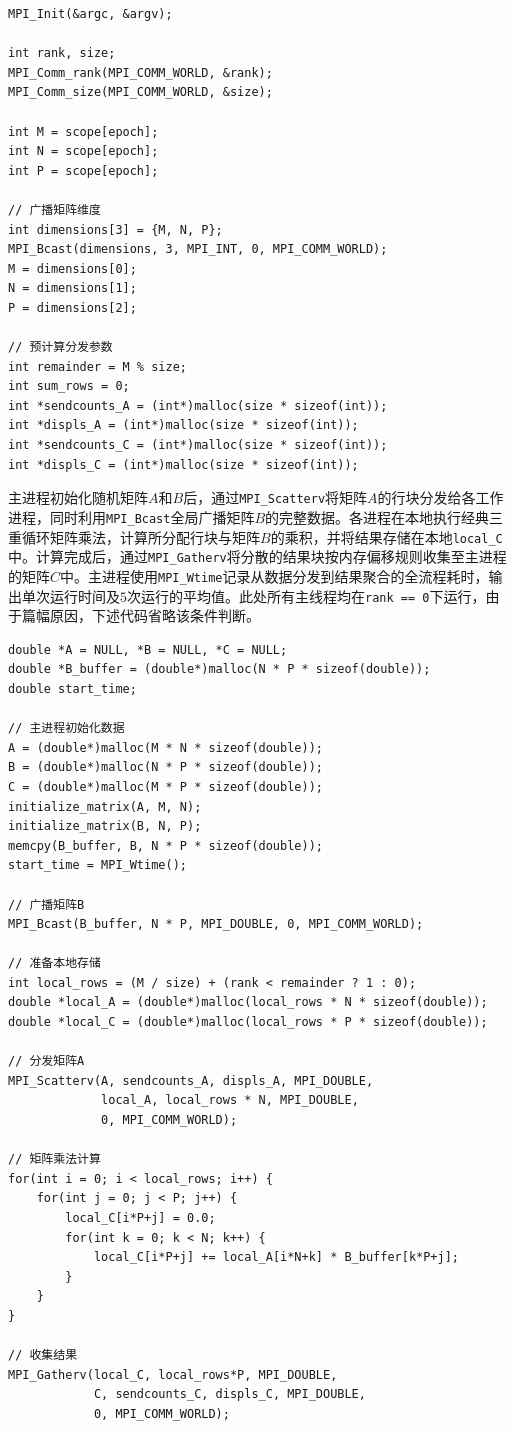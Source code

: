 \documentclass[a4paper, utf8]{ctexart}
\begin{document}
	\begin{verbatim}
MPI_Init(&argc, &argv);

int rank, size;
MPI_Comm_rank(MPI_COMM_WORLD, &rank);
MPI_Comm_size(MPI_COMM_WORLD, &size);

int M = scope[epoch];
int N = scope[epoch];
int P = scope[epoch];

// 广播矩阵维度
int dimensions[3] = {M, N, P};
MPI_Bcast(dimensions, 3, MPI_INT, 0, MPI_COMM_WORLD);
M = dimensions[0];
N = dimensions[1];
P = dimensions[2];

// 预计算分发参数
int remainder = M % size;
int sum_rows = 0;
int *sendcounts_A = (int*)malloc(size * sizeof(int));
int *displs_A = (int*)malloc(size * sizeof(int));
int *sendcounts_C = (int*)malloc(size * sizeof(int));
int *displs_C = (int*)malloc(size * sizeof(int));
	\end{verbatim}
	
	主进程初始化随机矩阵$A$和$B$后，通过\verb|MPI_Scatterv|将矩阵$A$的行块分发给各工作进程，同时利用\verb|MPI_Bcast|全局广播矩阵$B$的完整数据。各进程在本地执行经典三重循环矩阵乘法，计算所分配行块与矩阵$B$的乘积，并将结果存储在本地\verb|local_C|中。计算完成后，通过\verb|MPI_Gatherv|将分散的结果块按内存偏移规则收集至主进程的矩阵$C$中。主进程使用\verb|MPI_Wtime|记录从数据分发到结果聚合的全流程耗时，输出单次运行时间及$5$次运行的平均值。此处所有主线程均在\verb|rank == 0|下运行，由于篇幅原因，下述代码省略该条件判断。
	
	\begin{verbatim}
double *A = NULL, *B = NULL, *C = NULL;
double *B_buffer = (double*)malloc(N * P * sizeof(double));
double start_time;

// 主进程初始化数据
A = (double*)malloc(M * N * sizeof(double));
B = (double*)malloc(N * P * sizeof(double));
C = (double*)malloc(M * P * sizeof(double));
initialize_matrix(A, M, N);
initialize_matrix(B, N, P);
memcpy(B_buffer, B, N * P * sizeof(double));
start_time = MPI_Wtime();

// 广播矩阵B
MPI_Bcast(B_buffer, N * P, MPI_DOUBLE, 0, MPI_COMM_WORLD);

// 准备本地存储
int local_rows = (M / size) + (rank < remainder ? 1 : 0);
double *local_A = (double*)malloc(local_rows * N * sizeof(double));
double *local_C = (double*)malloc(local_rows * P * sizeof(double));

// 分发矩阵A
MPI_Scatterv(A, sendcounts_A, displs_A, MPI_DOUBLE,
             local_A, local_rows * N, MPI_DOUBLE,
             0, MPI_COMM_WORLD);

// 矩阵乘法计算
for(int i = 0; i < local_rows; i++) {
    for(int j = 0; j < P; j++) {
        local_C[i*P+j] = 0.0;
        for(int k = 0; k < N; k++) {
            local_C[i*P+j] += local_A[i*N+k] * B_buffer[k*P+j];
        }
    }
}

// 收集结果
MPI_Gatherv(local_C, local_rows*P, MPI_DOUBLE,
            C, sendcounts_C, displs_C, MPI_DOUBLE,
            0, MPI_COMM_WORLD);
	\end{verbatim}
	
\end{document}
